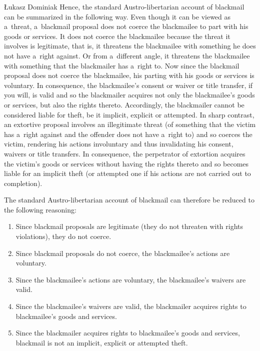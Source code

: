 \begin{artengenv}{Łukasz Dominiak}
Hence, the standard Austro-libertarian account of blackmail can be summarized in the following way. Even though it can be viewed as a~threat, a~blackmail proposal does not coerce the blackmailee to part with his goods or services. It does not coerce the blackmailee because the threat it involves is legitimate, that is, it threatens the blackmailee with something he does not have a~right against. Or from a~different angle, it threatens the blackmailee with something that the blackmailer has a~right to. Now since the blackmail proposal does not coerce the blackmailee, his parting with his goods or services is voluntary. In consequence, the blackmailee's consent or waiver or title transfer, if you will, is valid and so the blackmailer acquires not only the blackmailee's goods or services, but also the rights thereto. Accordingly, the blackmailer cannot be considered liable for theft, be it implicit, explicit or attempted. In sharp contrast, an extortive proposal involves an illegitimate threat (of something that the victim has a~right against and the offender does not have a~right to) and so coerces the victim, rendering his actions involuntary and thus invalidating his consent, waivers or title transfers. In consequence, the perpetrator of extortion acquires the victim's goods or services without having the rights thereto and so becomes liable for an implicit theft (or attempted one if his actions are not carried out to completion).



The standard Austro-libertarian account of blackmail can therefore be reduced to the following reasoning:



\begin{enumerate}

\item Since blackmail proposals are legitimate (they do not threaten with rights violations), they do not coerce.

\item Since blackmail proposals do not coerce, the blackmailee's actions are voluntary.

\item Since the blackmailee's actions are voluntary, the blackmailee's waivers are valid.

\item Since the blackmailee's waivers are valid, the blackmailer acquires rights to blackmailee's goods and services.

\item Since the blackmailer acquires rights to blackmailee's goods and services, blackmail is not an implicit, explicit or attempted theft.


\end{enumerate}
\end{artengenv}
